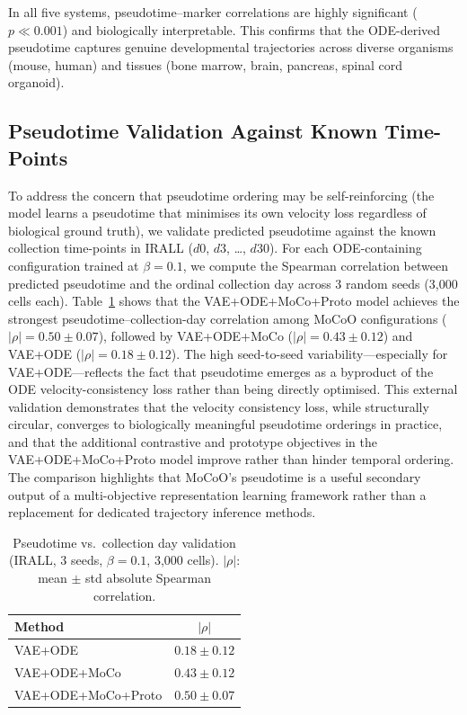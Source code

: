 \documentclass[journal]{IEEEtran}
\begin{document}
In all five systems, pseudotime--marker correlations are highly significant ($p \ll 0.001$) and biologically interpretable. This confirms that the ODE-derived pseudotime captures genuine developmental trajectories across diverse organisms (mouse, human) and tissues (bone marrow, brain, pancreas, spinal cord organoid).

\subsection{Pseudotime Validation Against Known Time-Points}
\label{sec:results:pseudotime}

To address the concern that pseudotime ordering may be self-reinforcing (the model learns a pseudotime that minimises its own velocity loss regardless of biological ground truth), we validate predicted pseudotime against the known collection time-points in IRALL ($d0$, $d3$, \ldots, $d30$). For each ODE-containing configuration trained at $\beta{=}0.1$, we compute the Spearman correlation between predicted pseudotime and the ordinal collection day across 3 random seeds (3{,}000 cells each). Table~\ref{tab:pseudotime_val} shows that the VAE+ODE+MoCo+Proto model achieves the strongest pseudotime--collection-day correlation among MoCoO configurations ($|\rho|{=}0.50{\pm}0.07$), followed by VAE+ODE+MoCo ($|\rho|{=}0.43{\pm}0.12$) and VAE+ODE ($|\rho|{=}0.18{\pm}0.12$). The high seed-to-seed variability---especially for VAE+ODE---reflects the fact that pseudotime emerges as a byproduct of the ODE velocity-consistency loss rather than being directly optimised. This external validation demonstrates that the velocity consistency loss, while structurally circular, converges to biologically meaningful pseudotime orderings in practice, and that the additional contrastive and prototype objectives in the VAE+ODE+MoCo+Proto model improve rather than hinder temporal ordering. The comparison highlights that MoCoO's pseudotime is a useful secondary output of a multi-objective representation learning framework rather than a replacement for dedicated trajectory inference methods.

\begin{table}[!t]
    \centering
    \caption{Pseudotime vs.\ collection day validation (IRALL, 3 seeds, $\beta{=}0.1$, 3{,}000 cells). $|\rho|$: mean $\pm$ std absolute Spearman correlation.}
    \label{tab:pseudotime_val}
    \begin{tabular}{lc}
        \toprule
        Method & $|\rho|$ \\
        \midrule
        VAE+ODE       & $0.18 \pm 0.12$ \\
        VAE+ODE+MoCo  & $0.43 \pm 0.12$ \\
        VAE+ODE+MoCo+Proto   & $\mathbf{0.50 \pm 0.07}$ \\
        \bottomrule
    \end{tabular}
\end{table}
\end{document}
